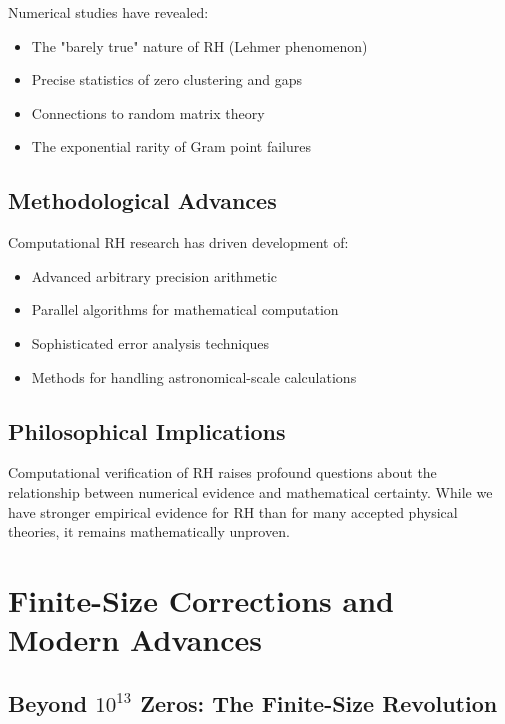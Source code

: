 \begin{theorem}
Numerical studies have revealed:
\begin{itemize}
\item The "barely true" nature of RH (Lehmer phenomenon)
\item Precise statistics of zero clustering and gaps  
\item Connections to random matrix theory
\item The exponential rarity of Gram point failures
\end{itemize}
\end{theorem}

\subsection{Methodological Advances}

Computational RH research has driven development of:
\begin{itemize}
\item Advanced arbitrary precision arithmetic
\item Parallel algorithms for mathematical computation
\item Sophisticated error analysis techniques
\item Methods for handling astronomical-scale calculations
\end{itemize}

\subsection{Philosophical Implications}

\begin{remark}
Computational verification of RH raises profound questions about the relationship between numerical evidence and mathematical certainty. While we have stronger empirical evidence for RH than for many accepted physical theories, it remains mathematically unproven.
\end{remark}

\section{Finite-Size Corrections and Modern Advances}
\label{sec:finite-size}

\subsection{Beyond $10^{13}$ Zeros: The Finite-Size Revolution}


